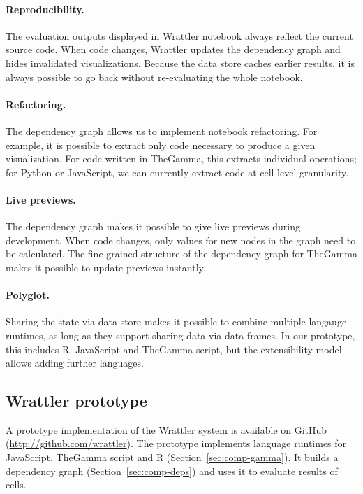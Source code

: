 \documentclass[sigplan]{acmart}\settopmatter{printfolios=true,printccs=false,printacmref=false}
\begin{document}
\paragraph{Reproducibility.} The evaluation outputs displayed in Wrattler notebook always reflect
the current source code. When code changes, Wrattler updates the dependency graph and hides 
invalidated visualizations. Because the data store caches earlier results, it is always possible
to go back without re-evaluating the whole notebook.

\paragraph{Refactoring.} The dependency graph allows us to implement notebook refactoring. 
For example, it is possible to extract only code necessary to produce a given visualization.
For code written in TheGamma, this extracts individual operations; for Python or JavaScript,
we can currently extract code at cell-level granularity.

\paragraph{Live previews.} The dependency graph makes it possible to give 
live previews during development. When code changes, only values for new nodes in the graph 
need to be calculated. The fine-grained structure of the dependency graph for TheGamma 
makes it possible to update previews instantly.

\paragraph{Polyglot.} Sharing the state via data store makes it possible to combine multiple
langauge runtimes, as long as they support sharing data via data frames. In our prototype, this
includes R, JavaScript and TheGamma script, but the extensibility model allows adding further
languages.

\subsection{Wrattler prototype}

A prototype implementation of the Wrattler system is available on GitHub (\url{http://github.com/wrattler}).
The prototype implements language runtimes for JavaScript, TheGamma script and R 
(Section~\ref{sec:comp-gamma}). It builds a dependency graph (Section~\ref{sec:comp-deps})
and uses it to evaluate results of cells. 
\end{document}
